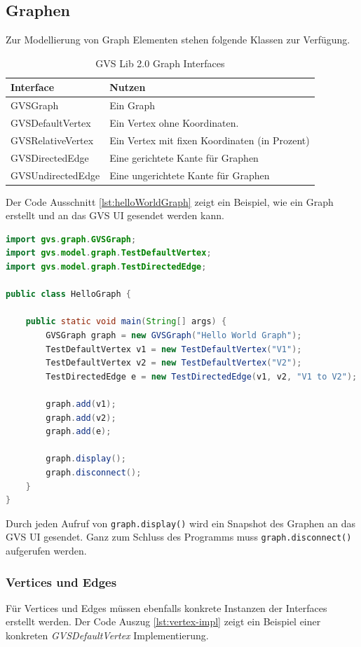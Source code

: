 \documentclass[11pt,a4paper,english,oneside]{book}
\numberwithin{equation}{chapter}
\begin{document}
	
	\subsection{Graphen}
	Zur Modellierung von Graph Elementen stehen folgende Klassen zur Verfügung.

	\begin{table}[h!]
		\centering
		\begin{tabularx}{\linewidth}{l l}
			\toprule 
			Interface & Nutzen \\
			\midrule
			GVSGraph & Ein Graph \\
			GVSDefaultVertex & Ein Vertex ohne Koordinaten. \\
			GVSRelativeVertex & Ein Vertex mit fixen Koordinaten (in Prozent) \\
			GVSDirectedEdge & Eine gerichtete Kante für Graphen \\
			GVSUndirectedEdge & Eine ungerichtete Kante für Graphen \\
			\bottomrule 
		\end{tabularx} 
		\caption{GVS Lib 2.0 Graph Interfaces} 
		\label{tbl:Interfaces}
	\end{table}
	
	Der Code Ausschnitt \ref{lst:helloWorldGraph} zeigt ein Beispiel, wie ein Graph erstellt und an das GVS UI gesendet werden kann.
	
\begin{lstlisting}[language=java, frame=single, caption={Hello World Graph}, label={lst:helloWorldGraph}]
import gvs.graph.GVSGraph;
import gvs.model.graph.TestDefaultVertex;
import gvs.model.graph.TestDirectedEdge;

public class HelloGraph {

	public static void main(String[] args) {
		GVSGraph graph = new GVSGraph("Hello World Graph");
		TestDefaultVertex v1 = new TestDefaultVertex("V1");
		TestDefaultVertex v2 = new TestDefaultVertex("V2");
		TestDirectedEdge e = new TestDirectedEdge(v1, v2, "V1 to V2");
		
		graph.add(v1);
		graph.add(v2);
		graph.add(e);
		
		graph.display();
		graph.disconnect();
	}
}
\end{lstlisting}	
	
	Durch jeden Aufruf von \lstinline{graph.display()} wird ein Snapshot des Graphen an das GVS UI gesendet. Ganz zum Schluss des Programms muss \lstinline{graph.disconnect()} aufgerufen werden.
	
	\subsubsection{Vertices und Edges}
	Für Vertices und Edges müssen ebenfalls konkrete Instanzen der Interfaces erstellt werden. Der Code Auszug \ref{lst:vertex-impl} zeigt ein Beispiel einer konkreten \textit{GVSDefaultVertex} Implementierung.
	
\end{document}
